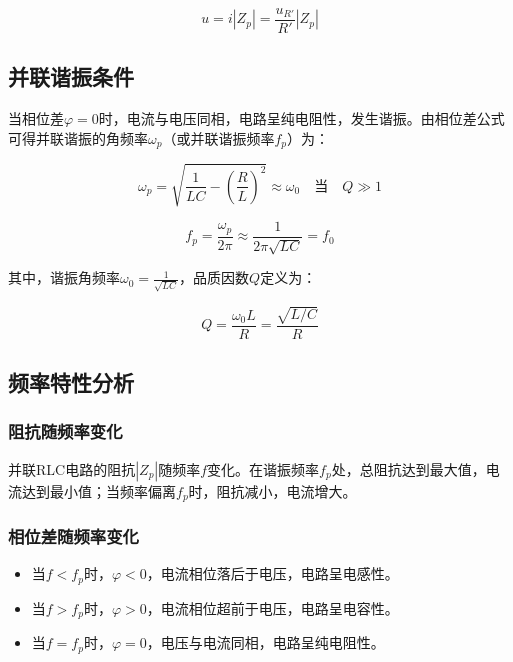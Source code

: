 \documentclass[zihao=5, UTF8]{article}
\theoremstyle{MyLineTheoremStyle} %
\theoremstyle{MyBlockTheoremStyle} %
\theoremstyle{MySubsubsectionStyle} %
\begin{document}
\begin{equation}
  u = i |Z_p| = \frac{u_{R'}}{R'} |Z_p|
\end{equation}

\subsection{并联谐振条件}

当相位差\( \varphi = 0 \)时，电流与电压同相，电路呈纯电阻性，发生谐振。由相位差公式可得并联谐振的角频率\( \omega_p \)（或并联谐振频率\( f_p \)）为：

\begin{equation}
\omega_p = \sqrt{\frac{1}{LC} - \left(\frac{R}{L}\right)^2} \approx \omega_0 \quad \text{当} \quad Q \gg 1
\end{equation}

\begin{equation}
f_p = \frac{\omega_p}{2\pi} \approx \frac{1}{2\pi\sqrt{LC}} = f_0
\end{equation}

其中，谐振角频率\( \omega_0 = \frac{1}{\sqrt{LC}} \)，品质因数\( Q \)定义为：

\begin{equation}
Q = \frac{\omega_0 L}{R} = \frac{\sqrt{L/C}}{R}
\end{equation}

\subsection{频率特性分析}

\subsubsection{阻抗随频率变化}

并联RLC电路的阻抗\( |Z_p| \)随频率\( f \)变化。在谐振频率\( f_p \)处，总阻抗达到最大值，电流达到最小值；当频率偏离\( f_p \)时，阻抗减小，电流增大。

\subsubsection{相位差随频率变化}

\begin{itemize}
    \item 当\( f < f_p \)时，\( \varphi < 0 \)，电流相位落后于电压，电路呈电感性。
    \item 当\( f > f_p \)时，\( \varphi > 0 \)，电流相位超前于电压，电路呈电容性。
    \item 当\( f = f_p \)时，\( \varphi = 0 \)，电压与电流同相，电路呈纯电阻性。
\end{itemize}
\end{document}
